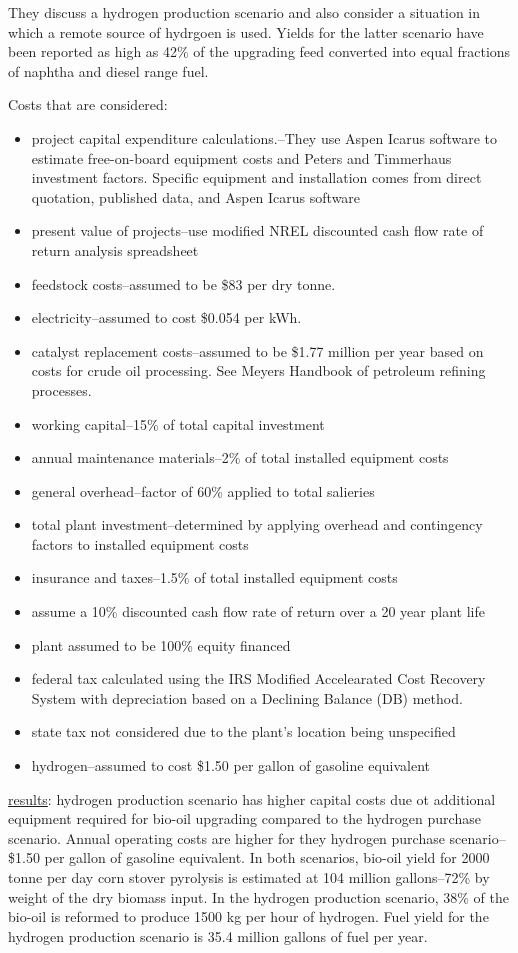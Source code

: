 \documentclass{article}\usepackage[]{graphicx}\usepackage[]{color}
\begin{document}
They discuss a hydrogen production scenario and also consider a situation in which a remote source of hydrgoen is used.  Yields for the latter scenario have been reported as high as 42\% of the upgrading feed converted into equal fractions of naphtha and diesel range fuel.

Costs that are considered:
\begin{itemize}
\item project capital expenditure calculations.--They use Aspen Icarus software to estimate free-on-board equipment costs and Peters and Timmerhaus investment factors.  Specific equipment and installation comes from direct quotation, published data, and Aspen Icarus software
\item present value of projects--use modified NREL discounted cash flow rate of return analysis spreadsheet
\item feedstock costs--assumed to be \$83 per dry tonne.  
\item electricity--assumed to cost \$0.054 per kWh.  
\item catalyst replacement costs--assumed to be \$1.77 million per year based on costs for crude oil processing.  See Meyers Handbook of petroleum refining processes.
\item working capital--15\% of total capital investment
\item annual maintenance materials--2\% of total installed equipment costs
\item general overhead--factor of 60\% applied to total salieries
\item total plant investment--determined by applying overhead and contingency factors to installed equipment costs
\item insurance and taxes--1.5\% of total installed equipment costs
\item assume a 10\% discounted cash flow rate of return over a 20 year plant life
\item plant assumed to be 100\% equity financed
\item federal tax calculated using the IRS Modified Accelearated Cost Recovery System with depreciation based on a Declining Balance (DB) method.
\item state tax not considered due to the plant's location being unspecified
\item hydrogen--assumed to cost \$1.50 per gallon of gasoline equivalent
\end{itemize}

\underline{results}: hydrogen production scenario has higher capital costs due ot additional equipment required for bio-oil upgrading compared to the hydrogen purchase scenario.  Annual operating costs are higher for they hydrogen purchase scenario--\$1.50 per gallon of gasoline equivalent.  In both scenarios, bio-oil yield for 2000 tonne per day corn stover pyrolysis is estimated at 104 million gallons--72\% by weight of the dry biomass input.  In the hydrogen production scenario, 38\% of the bio-oil is reformed to produce 1500 kg per hour of hydrogen.  Fuel yield for the hydrogen production scenario is 35.4 million gallons of fuel per year.  
\end{document}
